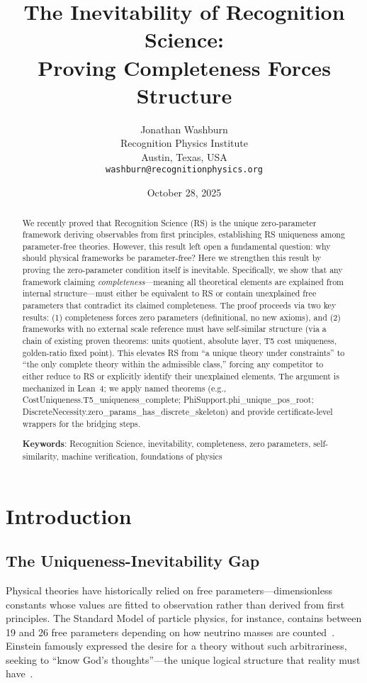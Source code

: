 \documentclass[12pt]{article}
\title{The Inevitability of Recognition Science:\\
       Proving Completeness Forces Structure}
\author{
  Jonathan Washburn\\
  Recognition Physics Institute\\
  Austin, Texas, USA\\
  \texttt{washburn@recognitionphysics.org}
}
\date{October 28, 2025}
\theoremstyle{remark}
\begin{document}
\maketitle

\begin{abstract}
We recently proved that Recognition Science (RS) is the unique zero-parameter framework deriving observables from first principles, establishing RS uniqueness among parameter-free theories. However, this result left open a fundamental question: why should physical frameworks be parameter-free? Here we strengthen this result by proving the zero-parameter condition itself is inevitable. Specifically, we show that any framework claiming \emph{completeness}---meaning all theoretical elements are explained from internal structure---must either be equivalent to RS or contain unexplained free parameters that contradict its claimed completeness. The proof proceeds via two key results: (1) completeness forces zero parameters (definitional, no new axioms), and (2) frameworks with no external scale reference must have self-similar structure (via a chain of existing proven theorems: units quotient, absolute layer, T5 cost uniqueness, golden-ratio fixed point). This elevates RS from ``a unique theory under constraints'' to ``the only complete theory within the admissible class,'' forcing any competitor to either reduce to RS or explicitly identify their unexplained elements. The argument is mechanized in Lean~4; we apply named theorems (e.g., CostUniqueness.T5\_uniqueness\_complete; PhiSupport.phi\_unique\_pos\_root; DiscreteNecessity.zero\_params\_has\_discrete\_skeleton) and provide certificate-level wrappers for the bridging steps.

\vspace{0.5em}
\noindent\textbf{Keywords}: Recognition Science, inevitability, completeness, zero parameters, self-similarity, machine verification, foundations of physics
\end{abstract}

\section{Introduction}

\subsection{The Uniqueness-Inevitability Gap}

Physical theories have historically relied on free parameters---dimensionless constants whose values are fitted to observation rather than derived from first principles. The Standard Model of particle physics, for instance, contains between 19 and 26 free parameters depending on how neutrino masses are counted~\cite{PDG2024}. Einstein famously expressed the desire for a theory without such arbitrariness, seeking to ``know God's thoughts''---the unique logical structure that reality must have~\cite{Einstein1954}.
\end{document}

